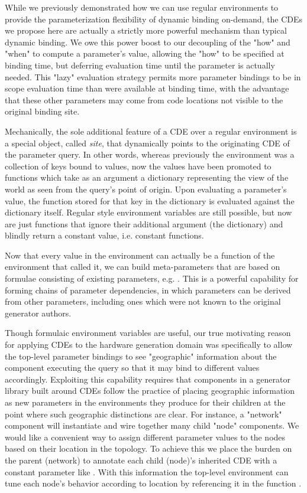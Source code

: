 While we previously demonstrated how we can use regular environments to provide the parameterization flexibility of dynamic binding on-demand, 
the CDEs we propose here are actually a strictly more powerful mechanism than typical dynamic binding. 
We owe this power boost to our decoupling of the "how" and "when" to compute a parameter's value,
allowing the "how" to be specified at binding time,
but deferring evaluation time until the parameter is actually needed.
This "lazy" evaluation strategy permits more parameter bindings to be in scope
evaluation time than were available at binding time, with the advantage that these
other parameters may come from code locations not visible to the original binding site.

Mechanically, the sole additional feature of a CDE over a regular environment is a special object, called \emph{site}, that dynamically points to the originating CDE of the parameter query.
In other words, whereas previously the environment was a collection of keys bound to values,
now the values have been promoted to functions which take as an argument a dictionary representing the view of the world as seen from the query's point of origin.
Upon evaluating a parameter's value, the function stored for that key in the dictionary is evaluated against the dictionary itself.
Regular style environment variables are still possible, but now are just functions that ignore their additional argument (the dictionary) and blindly return a constant value, i.e. constant functions. 

Now that every value in the environment can actually be a function of the environment that called it, we can
build meta-parameters that are based on formulae consisting of existing parameters, e.g. .
This is a powerful capability for forming chains of parameter dependencies, in which parameters can be derived from other parameters, including ones which were not known to the original generator authors.

Though formulaic environment variables are useful, our true motivating reason for applying CDEs 
to the hardware generation domain was specifically to allow the top-level parameter bindings to see "geographic" information
about the component executing the query so that it may bind to different values accordingly.
Exploiting this capability requires that components in a generator library built around CDEs follow the practice of placing geographic information
as new parameters in the environments they produce for their children at the point where such geographic distinctions are clear. 
For instance, a "network" component will instantiate and wire together many child "node" components.
We would like a convenient way to assign different parameter values to the nodes based on their location in the topology.
To achieve this we place the burden on the parent (network) to annotate each child (node)'s inherited CDE with a constant parameter like \code{[location -> (x,y)]}.
With this information the top-level environment can tune each node's behavior according to location by referencing it in the function \code{[foo = \$ -> ...expression dependent on site(location)...]}.

